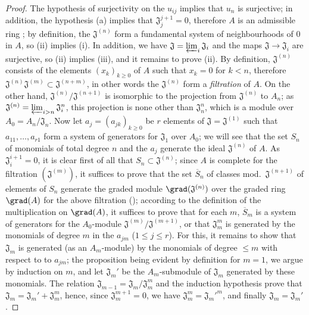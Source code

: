 \begin{proof}
The hypothesis of surjectivity on the $u_{ij}$ implies that $u_n$ is surjective;
in addition, the hypothesis (a) implies that $\mathfrak{J}_j^{j+1}=0$, therefore
$A$ is an admissible ring ; by definition, the
$\mathfrak{J}^{(n)}$ form a fundamental system of neighbourhoods of $0$ in $A$,
so (ii) implies (i). In addition, we have
$\mathfrak{J}=\varprojlim_i\mathfrak{J}_i$ and the maps
$\mathfrak{J}\to\mathfrak{J}_i$ are surjective, so (ii) implies (iii), and it
remains to prove (ii). By definition, $\mathfrak{J}^{(n)}$ consists of the
elements $(x_k)_{k\geq 0}$ of $A$ such that $x_k=0$ for $k<n$, therefore
$\mathfrak{J}^{(n)}\mathfrak{J}^{(m)}\subset\mathfrak{J}^{(n+m)}$, in other
words the $\mathfrak{J}^{(n)}$ form a \emph{filtration} of $A$. On the other
hand, $\mathfrak{J}^{(n)}/\mathfrak{J}^{(n+1)}$ is isomorphic to the projection
from $\mathfrak{J}^{(n)}$ to $A_n$; as
$\mathfrak{J}^{(n)}=\varprojlim_{i>n}\mathfrak{J}_i^n$, this projection is none
other than $\mathfrak{J}_n^n$, which is a module over $A_0=A_n/\mathfrak{J}_n$.
Now let $a_j=(a_{jk})_{k\geq 0}$ be $r$ elements of
$\mathfrak{J}=\mathfrak{J}^{(1)}$ such that $a_{11},\dots,a_{r1}$ form a system
of generators for $\mathfrak{J}_1$ over $A_0$; we will see that the set $S_n$ of
monomials of total degree $n$ and the $a_j$ generate the ideal
$\mathfrak{J}^{(n)}$ of $A$. As $\mathfrak{J}_i^{i+1}=0$, it is clear first of
all that $S_n\subset\mathfrak{J}^{(n)}$; since $A$ is complete for the
filtration $(\mathfrak{J}^{(m)})$, it suffices to prove that the set
$\overline{S}_n$ of classes mod.~$\mathfrak{J}^{(n+1)}$ of elements of $S_n$
generate the graded module $\grad(\mathfrak{J}^{(n)})$ over the graded ring
$\grad(A)$ for the above filtration (\cite[p.~18--06, lemme]{I-1}); according to
the definition of the multiplication on $\grad(A)$,
it suffices to prove that for each $m$, $\overline{S}_m$ is a system of
generators for the $A_0$-module $\mathfrak{J}^{(m)}/\mathfrak{J}^{(m+1)}$, or
that $\mathfrak{J}_m^m$ is generated by the monomials of degree $m$ in the
$a_{jm}$ ($1\leq j\leq r$). For this, it remains to show that
$\mathfrak{J}_m$ is generated (as an $A_m$-module) by the monomials of degree
$\leq m$ with respect to to $a_{jm}$; the proposition being evident by definition
for $m=1$, we argue by induction on $m$, and let $\mathfrak{J}_m'$ be the
$A_m$-submodule of $\mathfrak{J}_m$ generated by these monomials. The relation
$\mathfrak{J}_{m-1}=\mathfrak{J}_m/\mathfrak{J}_m^m$ and the induction
hypothesis prove that $\mathfrak{J}_m=\mathfrak{J}_m'+\mathfrak{J}_m^m$, hence,
since $\mathfrak{J}_m^{m+1}=0$, we have $\mathfrak{J}_m^m={\mathfrak{J}_m'}^m$,
and finally $\mathfrak{J}_m=\mathfrak{J}_m'$.
\end{proof}

